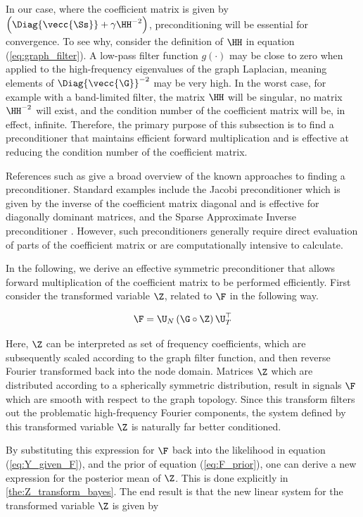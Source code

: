 In our case, where the coefficient matrix is given by $\Big(\Diag{\vecc{\Ss}} + \gamma  \HH^{-2}\Big)$, preconditioning will be essential for convergence. To see why, consider the definition of $\HH$ in equation (\ref{eq:graph_filter}). A low-pass filter function $g(\cdot)$ may be close to zero when applied to the  high-frequency eigenvalues of the graph Laplacian, meaning elements of $\Diag{\vecc{\G}}^{-2}$ may be very high. In the worst case, for example with a band-limited filter, the matrix $\HH$ will be singular, no matrix $\HH^{-2}$ will exist, and the condition number of the coefficient matrix will be, in effect, infinite. Therefore, the primary purpose of this subsection is to find a preconditioner that maintains efficient forward multiplication and is effective at reducing the condition number of the coefficient matrix.

References such as \citep{Saad2003} give a broad overview of the known approaches to finding a preconditioner. Standard examples include the Jacobi preconditioner which is given by the inverse of the coefficient matrix diagonal and is effective for diagonally dominant matrices, and the Sparse Approximate Inverse preconditioner \citep{Grote1997}. However, such preconditioners generally require direct evaluation of parts of the coefficient matrix or are computationally intensive to calculate.

In the following, we derive an effective symmetric preconditioner that allows forward multiplication of the coefficient matrix to be performed efficiently. First consider the transformed variable $\Z$, related to $\F$ in the following way.

\begin{equation}
    \label{eq:Z_transform}
    \F = \U_N \, (\G \circ \Z) \, \U_T^\top
\end{equation}

Here, $\Z$ can be interpreted as set of frequency coefficients, which are subsequently scaled according to the graph filter function, and then reverse Fourier transformed back into the node domain. Matrices $\Z$ which are distributed according to a spherically symmetric distribution, result in signals $\F$ which are smooth with respect to the graph topology. Since this transform filters out the problematic high-frequency Fourier components, the system defined by this transformed variable $\Z$ is naturally far better conditioned.

By substituting this expression for $\F$ back into the likelihood in equation (\ref{eq:Y_given_F}), and the prior of equation (\ref{eq:F_prior}), one can derive a new expression for the posterior mean of $\Z$. This is done explicitly in \cref{the:Z_transform_bayes}. The end result is that the new linear system for the transformed variable $\Z$ is given by


